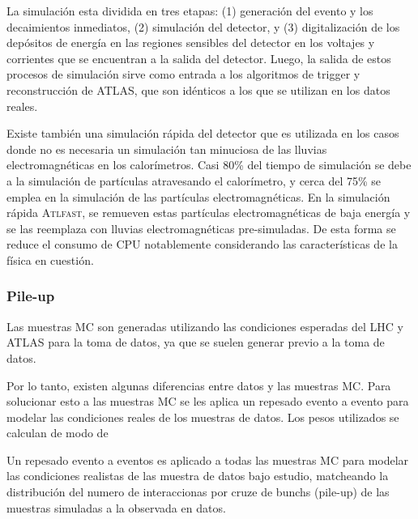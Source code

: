 La simulación esta dividida en tres etapas: (1) generación del evento y los
decaimientos inmediatos, (2) simulación del detector, y (3) digitalización de
los depósitos de energía en las regiones sensibles del detector en los voltajes
y corrientes que se encuentran a la salida del detector. Luego, la salida de
estos procesos de simulación sirve como entrada a los algoritmos de
trigger y reconstrucción de ATLAS, que son idénticos a los que se utilizan en
los datos reales.

Existe también una simulación rápida del detector que es utilizada en los casos
donde no es necesaria un simulación tan minuciosa de las lluvias
electromagnéticas en los calorímetros. Casi 80\% del tiempo de simulación se
debe a la simulación de partículas atravesando el calorímetro, y cerca del 75\%
se emplea en la simulación de las partículas electromagnéticas. En la simulación
rápida \textsc{Atlfast}\cite{Richter-Was:683751}, se remueven estas partículas
electromagnéticas de baja energía y se las reemplaza con lluvias
electromagnéticas pre-simuladas. De esta forma se reduce el consumo de CPU
notablemente considerando las características de la física en cuestión.


\subsubsection{Pile-up}

Las muestras MC son generadas utilizando las condiciones esperadas del LHC y
ATLAS para la toma de datos, ya que se suelen generar previo a la toma de datos.

Por lo tanto, existen algunas diferencias entre datos y las muestras MC. Para
solucionar esto a las muestras MC se les aplica un repesado evento a evento
para modelar las condiciones reales de los muestras de datos. Los pesos
utilizados se calculan de modo de


Un repesado evento a eventos es aplicado a todas las muestras MC para modelar las condiciones
realistas de las muestra de datos bajo estudio, matcheando la distribución del numero de interaccionas
por cruze de bunchs (pile-up) de las muestras simuladas a la observada en datos.



